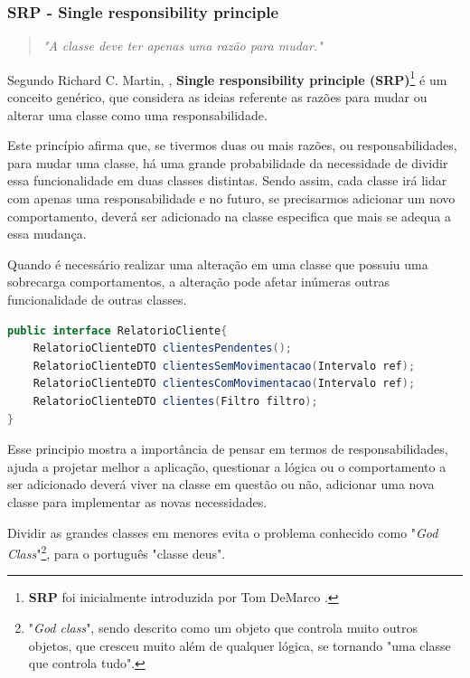 \documentclass[12pt]{article}
\begin{document}
\subsubsection{SRP - Single responsibility principle}

\begin{quote}
	\textit{"A classe deve ter apenas uma razão para mudar."}
\end{quote}

Segundo Richard C. Martin, \cite{ROBERT_MARTIN_THE_CLEAN_ARCHITECTURE}, \textbf{Single responsibility principle (SRP)}\footnote{\textbf{SRP} foi inicialmente introduzida por Tom DeMarco \cite{SASS_SRP}.} é um conceito genérico, que considera as ideias referente as razões para mudar ou alterar uma classe como uma responsabilidade. 

Este princípio afirma que, se tivermos duas ou mais razões, ou responsabilidades, para mudar uma classe, há uma grande probabilidade da necessidade de dividir essa funcionalidade em duas classes distintas. Sendo assim, cada classe irá lidar com apenas uma responsabilidade e no futuro, se precisarmos adicionar um novo comportamento, deverá ser adicionado na classe especifica que mais se adequa a essa mudança.

Quando é necessário realizar uma alteração em uma classe que possuiu uma sobrecarga comportamentos, a alteração pode afetar inúmeras outras funcionalidade de outras classes.

\begin{lstlisting}[caption=Exemplo em conformidade ao SRP,language=java]
public interface RelatorioCliente{
	RelatorioClienteDTO clientesPendentes();
	RelatorioClienteDTO clientesSemMovimentacao(Intervalo ref);	
	RelatorioClienteDTO clientesComMovimentacao(Intervalo ref);
	RelatorioClienteDTO clientes(Filtro filtro);		
}
\end{lstlisting}

Esse principio mostra a importância de pensar em termos de responsabilidades, ajuda a projetar melhor a aplicação, questionar a lógica ou o comportamento a ser adicionado deverá viver na classe em questão ou não, adicionar uma nova classe para implementar as novas necessidades.

Dividir as grandes classes em menores evita o problema conhecido como "\textit{God Class}"\footnote{"\textit{God class}", sendo descrito como um objeto que controla muito outros objetos, que cresceu muito além de qualquer lógica, se tornando "uma classe que controla tudo".}\cite{GOD_CLASS}, para o português "classe deus". 
\end{document}
